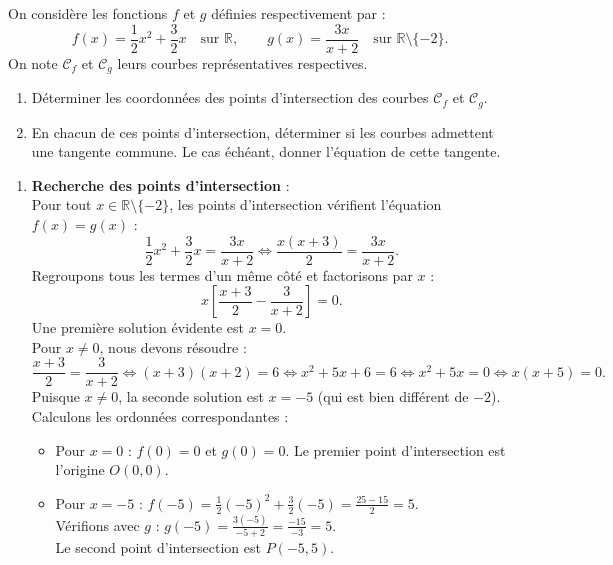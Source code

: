 \documentclass[11pt,a4paper]{article}
\newcommand{\R}{\mathbb{R}}
\begin{document}
On considère les fonctions $f$ et $g$ définies respectivement par :
\[
f(x) = \frac{1}{2}x^2 + \frac{3}{2}x \quad \text{sur } \R, \qquad g(x) = \frac{3x}{x+2} \quad \text{sur } \R \setminus \{-2\}.
\]
On note $\mathcal{C}_f$ et $\mathcal{C}_g$ leurs courbes représentatives respectives.
\begin{enumerate}[label=\textbf{\arabic*.}]
    \item Déterminer les coordonnées des points d'intersection des courbes $\mathcal{C}_f$ et $\mathcal{C}_g$.
    \item En chacun de ces points d'intersection, déterminer si les courbes admettent une tangente commune. Le cas échéant, donner l'équation de cette tangente.
\end{enumerate}

\begin{correctionbox}
\begin{enumerate}[label=\textbf{\arabic*.}]
    \item \textbf{Recherche des points d'intersection} :\\
    Pour tout $x \in \R \setminus \{-2\}$, les points d'intersection vérifient l'équation $f(x) = g(x)$ :
    \[
    \frac{1}{2}x^2 + \frac{3}{2}x = \frac{3x}{x+2} \iff \frac{x(x+3)}{2} = \frac{3x}{x+2}.
    \]
    Regroupons tous les termes d'un même côté et factorisons par $x$ :
    \[
    x \left[ \frac{x+3}{2} - \frac{3}{x+2} \right] = 0.
    \]
    Une première solution évidente est $x = 0$.\\
    Pour $x \neq 0$, nous devons résoudre :
    \[
    \frac{x+3}{2} = \frac{3}{x+2} \iff (x+3)(x+2) = 6 \iff x^2 + 5x + 6 = 6 \iff x^2 + 5x = 0 \iff x(x+5) = 0.
    \]
    Puisque $x \neq 0$, la seconde solution est $x = -5$ (qui est bien différent de $-2$).\\
    Calculons les ordonnées correspondantes :
    \begin{itemize}
        \item Pour $x = 0$ : $f(0) = 0$ et $g(0) = 0$. Le premier point d'intersection est l'origine $O(0, 0)$.
        \item Pour $x = -5$ : $f(-5) = \frac{1}{2}(-5)^2 + \frac{3}{2}(-5) = \frac{25 - 15}{2} = 5$.\\
        Vérifions avec $g$ : $g(-5) = \frac{3(-5)}{-5+2} = \frac{-15}{-3} = 5$.\\
        Le second point d'intersection est $P(-5, 5)$.
    \end{itemize}


\end{enumerate}
\end{correctionbox}
\end{document}
